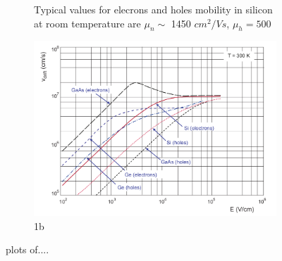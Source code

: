 \begin{titlepage}
\begin{figure}
\begin{subfigure}{.5\textwidth}
     \caption{Typical values for elecrons and holes mobility 
     in silicon at room temperature are $\mu _n \sim$ 1450 $cm^2/Vs$, $\mu _h = 500$}
     \label{fig:sfig1}
   \end{subfigure}%
   \begin{subfigure}{.5\textwidth}
     \centering
     \includegraphics[width=.8\linewidth]{figures/velocity_in_semiconductor.png}
     \caption{1b}
     \label{fig:sfig2}
   \end{subfigure}
   \caption{plots of....}
   \label{fig:mobility_drift}
\end{figure}


\end{titlepage}
